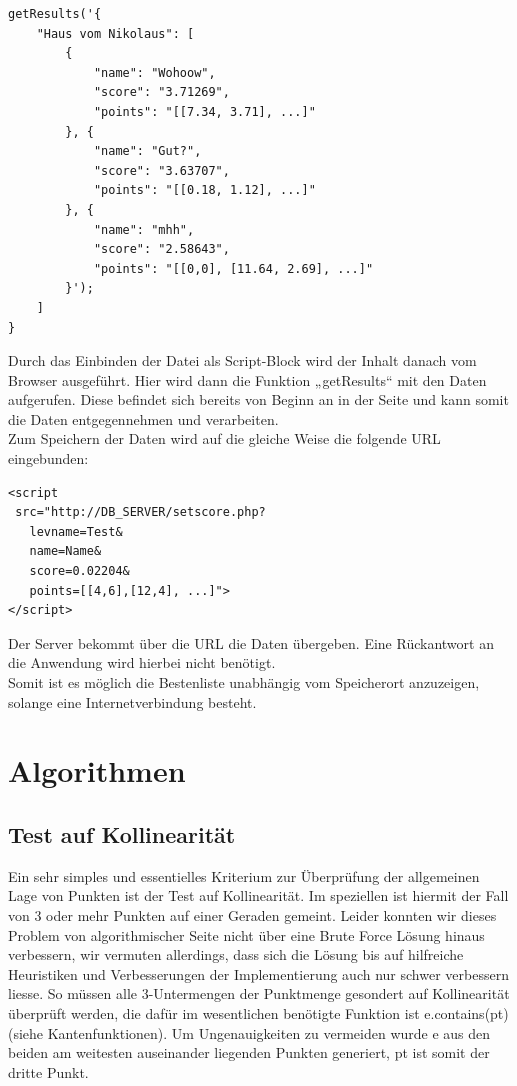 \documentclass[a4paper,twocolumn]{scrartcl}
\newcommand{\lststyle}[1]{{\usefont{T1}{pcr}{m}{n}\small\selectfont#1}}
\begin{document}
\newblock
\begin{lstlisting}
getResults('{
    "Haus vom Nikolaus": [
        {
            "name": "Wohoow",
            "score": "3.71269",
            "points": "[[7.34, 3.71], ...]"
        }, {
            "name": "Gut?",
            "score": "3.63707",
            "points": "[[0.18, 1.12], ...]"
        }, {
            "name": "mhh",
            "score": "2.58643",
            "points": "[[0,0], [11.64, 2.69], ...]"
        }');
    ]
}
\end{lstlisting}
\newblock
Durch das Einbinden der Datei als Script-Block wird der Inhalt danach vom Browser ausgeführt. Hier wird dann die Funktion „getResults“ mit den Daten aufgerufen. Diese befindet sich bereits von Beginn an in der Seite und kann somit die Daten entgegennehmen und verarbeiten.\\
Zum Speichern der Daten wird auf die gleiche Weise die folgende URL eingebunden:\\

\begin{lstlisting}
<script
 src="http://DB_SERVER/setscore.php?
   levname=Test&
   name=Name&
   score=0.02204&
   points=[[4,6],[12,4], ...]">
</script>
\end{lstlisting}
Der Server bekommt über die URL die Daten übergeben. Eine Rückantwort an die Anwendung wird hierbei nicht benötigt.\\
Somit ist es möglich die Bestenliste unabhängig vom Speicherort anzuzeigen, solange eine Internetverbindung besteht.


\section{Algorithmen}

\subsection{Test auf Kollinearität}
Ein sehr simples und essentielles Kriterium zur Überprüfung der allgemeinen Lage von Punkten ist der Test auf Kollinearität. Im speziellen ist hiermit der Fall von 3 oder mehr Punkten auf einer Geraden gemeint. Leider konnten wir dieses Problem von algorithmischer Seite nicht über eine Brute Force Lösung hinaus verbessern, wir vermuten allerdings, dass sich die Lösung bis auf hilfreiche Heuristiken und Verbesserungen der Implementierung auch nur schwer verbessern liesse. So müssen alle 3-Untermengen der Punktmenge gesondert auf Kollinearität überprüft werden, die dafür im wesentlichen benötigte Funktion ist \lststyle{e.contains(pt)} (siehe Kantenfunktionen). Um Ungenauigkeiten zu vermeiden wurde \lststyle{e} aus den beiden am weitesten auseinander liegenden Punkten generiert, \lststyle{pt} ist somit der dritte Punkt.  
\end{document}
